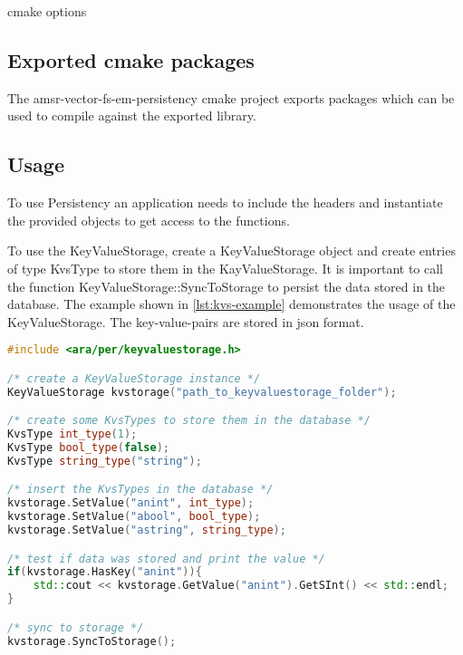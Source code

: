 \begin{table}[h!]
	\caption{cmake options}
	\label{tab:cmakeOptions}
\end{table}

\subsection{Exported cmake packages}{}
\label{sec:Cmake:Build:Packages}
The amsr-vector-fs-em-persistency cmake project exports packages which can be
used to compile against the exported
library.

\subsection{Usage}
\label{sec:Cmake:Build:Usage}
To use Persistency an application needs to include the headers and instantiate
the provided objects to get access to
the functions.

To use the KeyValueStorage, create a KeyValueStorage object and create entries
of type KvsType to store them in the
KayValueStorage. It is important to call the function
KeyValueStorage::SyncToStorage to persist the data stored in the
database. The example shown in \ref{lst:kvs-example} demonstrates the usage of
the KeyValueStorage. The key-value-pairs
are stored in json format.

\begin{lstlisting}[language=C++, caption={Example usage of the KeyValueStorage}, captionpos=b, label={lst:kvs-example}]
#include <ara/per/keyvaluestorage.h>

/* create a KeyValueStorage instance */
KeyValueStorage kvstorage("path_to_keyvaluestorage_folder");

/* create some KvsTypes to store them in the database */
KvsType int_type(1);
KvsType bool_type(false);
KvsType string_type("string");

/* insert the KvsTypes in the database */
kvstorage.SetValue("anint", int_type);
kvstorage.SetValue("abool", bool_type);
kvstorage.SetValue("astring", string_type);

/* test if data was stored and print the value */
if(kvstorage.HasKey("anint")){
    std::cout << kvstorage.GetValue("anint").GetSInt() << std::endl;
}

/* sync to storage */
kvstorage.SyncToStorage();

\end{lstlisting}


